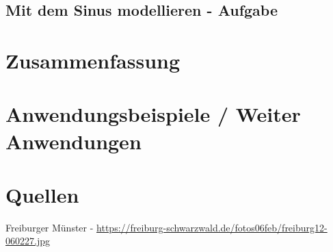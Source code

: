 \documentclass[12pt,a4paper]{article}
\begin{document}
\subsection{Mit dem Sinus modellieren - Aufgabe}

\section{Zusammenfassung}

\section{Anwendungsbeispiele / Weiter Anwendungen}

\section{Quellen}
Freiburger Münster - \url{https://freiburg-schwarzwald.de/fotos06feb/freiburg12-060227.jpg}
\end{document}
